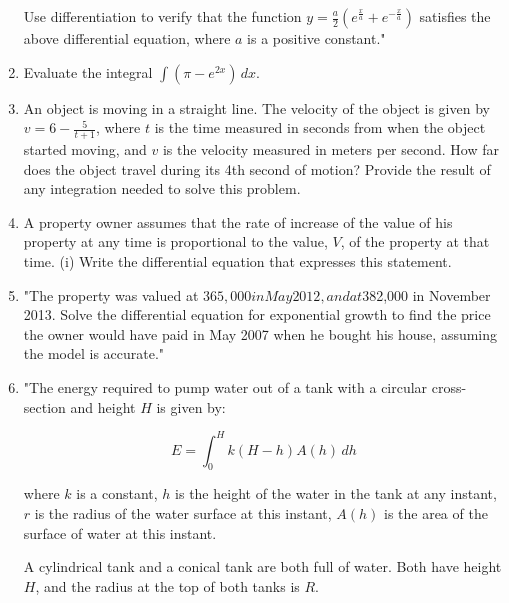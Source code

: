 \documentclass{article}
\begin{document}
\begin{enumerate}
Use differentiation to verify that the function \( y = \frac{a}{2} \left( e^{\frac{x}{a}} + e^{-\frac{x}{a}} \right) \) satisfies the above differential equation, where \( a \) is a positive constant."
\vspace{3cm}
\item Evaluate the integral \(\int (\pi - e^{2x}) \, dx\).
\vspace{3cm}
\item An object is moving in a straight line. The velocity of the object is given by \(v = 6 - \frac{5}{t+1}\), where \(t\) is the time measured in seconds from when the object started moving, and \(v\) is the velocity measured in meters per second. How far does the object travel during its 4th second of motion? Provide the result of any integration needed to solve this problem.
\vspace{3cm}
\item A property owner assumes that the rate of increase of the value of his property at any time is proportional to the value, \( V \), of the property at that time. (i) Write the differential equation that expresses this statement.
\vspace{3cm}
\item "The property was valued at $365,000 in May 2012, and at $382,000 in November 2013. Solve the differential equation for exponential growth to find the price the owner would have paid in May 2007 when he bought his house, assuming the model is accurate."
\vspace{3cm}
\item "The energy required to pump water out of a tank with a circular cross-section and height \( H \) is given by:

\[ 
E = \int_0^H k(H-h)A(h) \, dh 
\]

where  
\( k \) is a constant,  
\( h \) is the height of the water in the tank at any instant,  
\( r \) is the radius of the water surface at this instant,  
\( A(h) \) is the area of the surface of water at this instant.

A cylindrical tank and a conical tank are both full of water. Both have height \( H \), and the radius at the top of both tanks is \( R \).


\end{enumerate}
\end{document}
